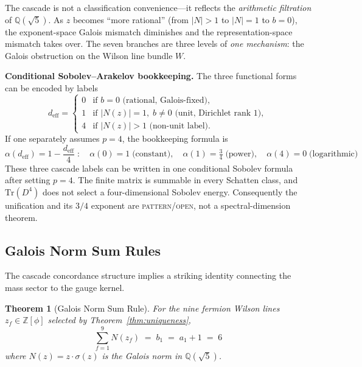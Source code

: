 \documentclass[12pt,a4paper]{article}
\newtheorem{theorem}{Theorem}
\theoremstyle{definition}
\begin{document}
The cascade is not a classification convenience---it reflects the \emph{arithmetic filtration} of $\mathbb{Q}(\sqrt{5})$.  As $z$ becomes ``more rational'' (from $|N| > 1$ to $|N| = 1$ to $b = 0$), the exponent-space Galois mismatch diminishes and the representation-space mismatch takes over.  The seven branches are three levels of \emph{one mechanism}: the Galois obstruction on the Wilson line bundle $W$.

\textbf{Conditional Sobolev--Arakelov bookkeeping.}  The three functional forms can be encoded by labels
\begin{equation}
d_{\text{eff}} =
\begin{cases}
0 & \text{if } b = 0 \text{ (rational, Galois-fixed)}, \\
1 & \text{if } |N(z)| = 1,\; b \neq 0 \text{ (unit, Dirichlet rank 1)}, \\
4 & \text{if } |N(z)| > 1 \text{ (non-unit label)}.
\end{cases}
\label{eq:d_eff}
\end{equation}
If one separately assumes $p=4$, the bookkeeping formula is
\begin{equation}
\boxed{\alpha(d_{\text{eff}}) = 1 - \frac{d_{\text{eff}}}{4} \;:\quad
\alpha(0) = 1\;\text{(constant)},\quad
\alpha(1) = \tfrac{3}{4}\;\text{(power)},\quad
\alpha(4) = 0\;\text{(logarithmic)}}
\label{eq:morrey_alpha}
\end{equation}
These three cascade labels can be written in one conditional Sobolev formula after setting $p=4$.  The finite matrix is summable in every Schatten class, and $\mathrm{Tr}(D^4)$ does not select a four-dimensional Sobolev energy.  Consequently the unification and its $3/4$ exponent are \textsc{pattern/open}, not a spectral-dimension theorem.

\subsection{Galois Norm Sum Rules}
\label{sec:norm_sum}

The cascade concordance structure implies a striking identity connecting the mass sector to the gauge kernel.

\begin{theorem}[Galois Norm Sum Rule]\label{thm:norm_sum}
For the nine fermion Wilson lines $z_f \in \mathbb{Z}[\phi]$ selected by Theorem~\ref{thm:uniqueness},
\begin{equation}
\boxed{\sum_{f=1}^{9} N(z_f) \;=\; b_1 \;=\; a_1 + 1 \;=\; 6}
\label{eq:norm_sum}
\end{equation}
where $N(z) = z \cdot \sigma(z)$ is the Galois norm in $\mathbb{Q}(\sqrt{5})$.
\end{theorem}
\end{document}
